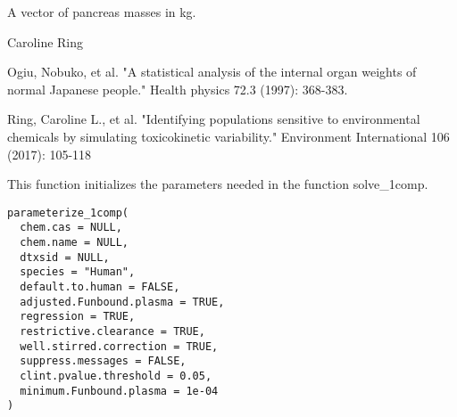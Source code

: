 \documentclass[a4paper]{book}
\begin{document}
%
\begin{Value}
A vector of pancreas masses in kg.
\end{Value}
%
\begin{Author}\relax
Caroline Ring
\end{Author}
%
\begin{References}\relax
Ogiu, Nobuko, et al. "A statistical analysis of the internal 
organ weights of normal Japanese people." Health physics 72.3 (1997): 368-383.

Ring, Caroline L., et al. "Identifying populations sensitive to
environmental chemicals by simulating toxicokinetic variability."
Environment International 106 (2017): 105-118
\end{References}
%
\begin{Description}\relax
This function initializes the parameters needed in the function solve\_1comp.
\end{Description}
%
\begin{Usage}
\begin{verbatim}
parameterize_1comp(
  chem.cas = NULL,
  chem.name = NULL,
  dtxsid = NULL,
  species = "Human",
  default.to.human = FALSE,
  adjusted.Funbound.plasma = TRUE,
  regression = TRUE,
  restrictive.clearance = TRUE,
  well.stirred.correction = TRUE,
  suppress.messages = FALSE,
  clint.pvalue.threshold = 0.05,
  minimum.Funbound.plasma = 1e-04
)
\end{verbatim}
\end{Usage}
%
\end{document}
